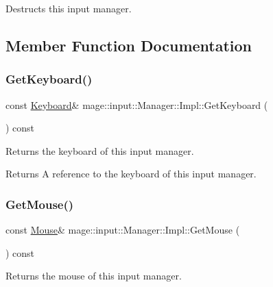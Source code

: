 Destructs this input manager. 

\subsection{Member Function Documentation}
\mbox{\label{classmage_1_1input_1_1_manager_1_1_impl_a7b43fbe5a7fd8697fea0e3c6b7d76186}} 
\subsubsection{\texorpdfstring{Get\+Keyboard()}{GetKeyboard()}}
{\footnotesize\ttfamily const \mbox{\hyperlink{classmage_1_1input_1_1_keyboard}{Keyboard}}\& mage\+::input\+::\+Manager\+::\+Impl\+::\+Get\+Keyboard (\begin{DoxyParamCaption}{ }\end{DoxyParamCaption}) const\hspace{0.3cm}{\ttfamily [noexcept]}}

Returns the keyboard of this input manager.

\begin{DoxyReturn}{Returns}
A reference to the keyboard of this input manager. 
\end{DoxyReturn}
\mbox{\label{classmage_1_1input_1_1_manager_1_1_impl_a0ed01275d65a2fe3998c95fef0e12a8b}} 
\subsubsection{\texorpdfstring{Get\+Mouse()}{GetMouse()}}
{\footnotesize\ttfamily const \mbox{\hyperlink{classmage_1_1input_1_1_mouse}{Mouse}}\& mage\+::input\+::\+Manager\+::\+Impl\+::\+Get\+Mouse (\begin{DoxyParamCaption}{ }\end{DoxyParamCaption}) const\hspace{0.3cm}{\ttfamily [noexcept]}}

Returns the mouse of this input manager.

